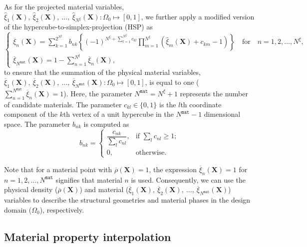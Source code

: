 \documentclass[preprint,11pt]{elsarticle}
\theoremstyle{definition}
\begin{document}
As for the projected material variables, $\widehat{\xi}_1(\mathbf{X}),\ \widehat{\xi}_2(\mathbf{X}),\ \ldots,\ \widehat{\xi}_{N^\xi}(\mathbf{X}): \Omega_0 \mapsto [0, 1]$, we further apply a modified version of the hypercube-to-simplex-projection (HSP) \citep{zhou_multi-component_2018} as
\begin{equation*}
    \left\{ \begin{array}{l}
        \overline{\xi}_n(\mathbf{X}) = \displaystyle{ \sum_{k=1}^{2^{N^\xi}} b_{nk}
        \left\{ (-1)^{N^\xi + \sum_{l=1}^{N^\xi}c_{kl}}
        \prod_{m=1}^{N^\xi} (\widehat{\xi}_m(\mathbf{X}) + c_{km} - 1) \right\} }
        \quad \text{for} \quad n=1,2,\ldots,N^\xi, \\[15pt]
        \overline{\xi}_{N^\texttt{mat}}(\mathbf{X}) = \displaystyle{ 1 - \sum_{n=1}^{N^\xi} } \overline{\xi}_n(\mathbf{X}),
    \end{array} \right.
\end{equation*}
to ensure that the summation of the physical material variables, $\overline{\xi}_1(\mathbf{X}),\ \overline{\xi}_2(\mathbf{X}),\ \ldots,\ \overline{\xi}_{N^\texttt{mat}}(\mathbf{X}): \Omega_0 \mapsto [0, 1]$, is equal to one ($\sum_{n=1}^{N^\texttt{mat}}\overline{\xi}_n(\mathbf{X}) = 1$). Here, the parameter $N^\texttt{mat} = N^\xi + 1$ represents the number of candidate materials. The parameter $c_{kl} \in \{0, 1\}$ is the $l$th coordinate component of the $k$th vertex of a unit hypercube in the $N^\texttt{mat}-1$ dimensional space. The parameter $b_{nk}$ is computed as
\begin{equation*}
    b_{nk} = \left\{ \begin{array}{cc}
        \dfrac{c_{nk}}{\sum_{l} c_{nl}}, & \text{if $\sum_{l} c_{nl} \geq 1$}; \\[8pt]
        0, & \text{otherwise}.
    \end{array} \right.
\end{equation*}

Note that for a material point with $\overline{\rho}(\mathbf{X}) = 1$, the expression $\overline{\xi}_n(\mathbf{X}) = 1$ for $n=1,2,\ldots,N^\texttt{mat}$ signifies that material $n$ is used. Consequently, we can use the physical density ($\overline{\rho}(\mathbf{X})$) and material ($\overline{\xi}_1(\mathbf{X}),\ \overline{\xi}_2(\mathbf{X}),\ \ldots,\ \overline{\xi}_{N^\texttt{mat}}(\mathbf{X})$) variables to describe the structural geometries and material phases in the design domain ($\Omega_0$), respectively.

\subsection{Material property interpolation}
\end{document}
